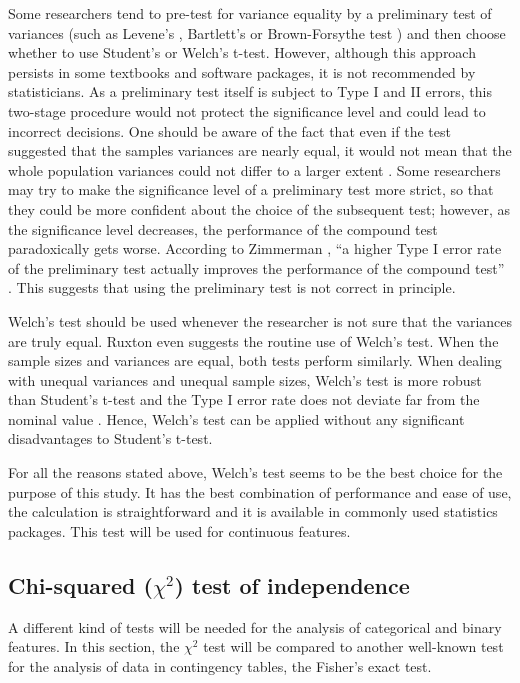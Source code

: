 Some researchers tend to pre-test for variance equality by a preliminary test of variances (such as Levene's \cite{levene}, Bartlett's \cite{bartlett} or Brown-Forsythe test \cite{brown}) and then choose whether to use Student's or Welch's t-test. However, although this approach persists in some textbooks and software packages, it is not recommended by statisticians. As a preliminary test itself is subject to Type I and II errors, this two-stage procedure would not protect the significance level and could lead to incorrect decisions. One should be aware of the fact that even if the test suggested that the samples variances are nearly equal, it would not mean that the whole population variances could not differ to a larger extent \cite{zimmerman}. Some researchers may try to make the significance level of a preliminary test more strict, so that they could be more confident about the choice of the subsequent test; however, as the significance level decreases, the performance of the compound test paradoxically gets worse. According to Zimmerman \cite{zimmerman}, ``a higher Type I error rate of the preliminary test actually improves the performance of the compound test'' \cite{zimmerman}. This suggests that using the preliminary test is not correct in principle.

Welch's test should be used whenever the researcher is not sure that the variances are truly equal. Ruxton \cite{ruxton} even suggests the routine use of Welch's test. When the sample sizes and variances are equal, both tests perform similarly. When dealing with unequal variances and unequal sample sizes, Welch's test is more robust than Student's t-test and the Type I error rate does not deviate far from the nominal value \cite{derrick}. Hence, Welch's test can be applied without any significant disadvantages to Student's t-test.

For all the reasons stated above, Welch's test seems to be the best choice for the purpose of this study. It has the best combination of performance and ease of use, the calculation is straightforward and it is available in commonly used statistics packages. This test will be used for continuous features.

\subsection{Chi-squared ($\chi^{2}$) test of independence}

A different kind of tests will be needed for the analysis of categorical and binary features. In this section, the $\chi^{2}$ test will be compared to another well-known test for the analysis of data in contingency tables, the Fisher's exact test.

